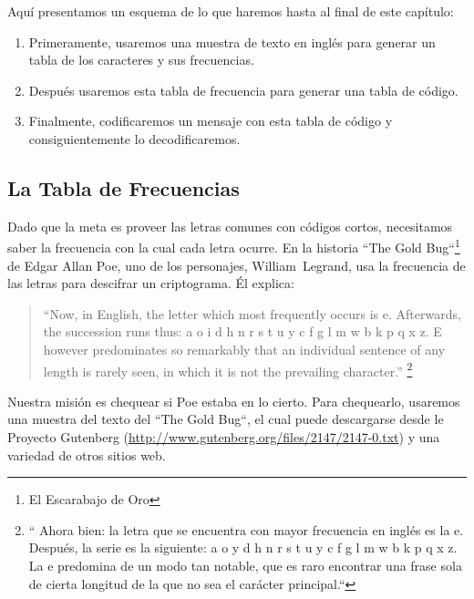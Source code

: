 Aquí presentamos un esquema de lo que haremos hasta al final de este capítulo:

\begin{enumerate}

\item Primeramente, usaremos una muestra de texto en inglés para generar
un tabla de los caracteres y sus frecuencias.

\item Después usaremos esta tabla de frecuencia para generar una tabla
de código.

\item Finalmente, codificaremos un mensaje con esta tabla de código y 
consiguientemente lo decodificaremos.

\end{enumerate}

\subsection{La Tabla de Frecuencias}

Dado que la meta es proveer las letras comunes con códigos
cortos, necesitamos saber la frecuencia con la cual cada letra
ocurre. En la historia ``The Gold Bug``\footnote{El Escarabajo de Oro} 
de Edgar Allan Poe, uno de los personajes, William~Legrand, 
usa la frecuencia de las letras para descifrar un criptograma. Él explica: 

\begin{quote}
``Now, in English, the letter which most frequently occurs 
is e. Afterwards, the succession runs thus: a o i d h n r s 
t u y c f g l m w b k p q x z. E however predominates so 
remarkably that an individual sentence of any length is 
rarely seen, in which it is not the prevailing character.''
\footnote{
``
Ahora bien: la letra que se encuentra con mayor frecuencia en inglés es la 
e. Después, la serie es la  siguiente: a o y d h n r s t u y c f g l m w b k p q x z. 
La e predomina de un modo tan notable, que es raro encontrar una frase sola de
cierta longitud de la que no sea el carácter principal.``}
\end{quote}

Nuestra misión es chequear si Poe estaba en lo cierto. Para chequearlo,
usaremos una muestra del texto del ``The Gold Bug``, el cual
puede descargarse desde le Proyecto Gutenberg
(\url{http://www.gutenberg.org/files/2147/2147-0.txt}) 
y una variedad de otros sitios web.

